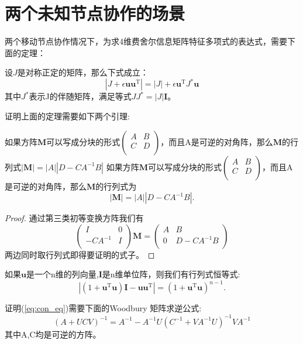 \section{两个未知节点协作的场景}\label{section:two_node_cooperation}
两个移动节点协作情况下，为求4维费舍尔信息矩阵特征多项式的表达式，需要下面的定理：
\begin{theorem}\label{thm:ShenIden}
设$J$是对称正定的矩阵，那么下式成立：
\begin{equation}\label{eq:ShenIden}
|J+\epsilon \bm{u}\bm{u}^{\textrm{T}} |=|J|+\epsilon \bm{u}^{\textrm{T}} J^*\bm{u}
\end{equation}
其中$J^*$表示J的伴随矩阵，满足等式$JJ^*=|J|\bm{I}$。
\end{theorem}
证明上面的定理需要如下两个引理:
\begin{lemma}\cite{aa}\label{lemma:block}
如果方阵$\bm{M}$可以写成分块的形式$\left(\begin{array}{cc}
A&B\\
C&D\\
\end{array}\right)$，而且A是可逆的对角阵，那么$\bm{M}$的行列式$|\bm{M}|=|A||D-CA^{-1}B|$
如果方阵$\bm{M}$可以写成分块的形式$\left(\begin{array}{cc}
A&B\\
C&D\\
\end{array}\right)$，而且A是可逆的对角阵，那么$\bm{M}$的行列式为
\begin{equation}
|\bm{M}|=|A||D-CA^{-1}B|.
\end{equation}
\end{lemma}
\begin{proof}
通过第三类初等变换方阵我们有
\begin{equation}
\left(\begin{array}{cc}
I&0\\
-CA^{-1}&I\\
\end{array}\right) \bm{M}=\left(\begin{array}{cc}
A&B\\
0&D-CA^{-1}B\\
\end{array}\right)
\end{equation}
两边同时取行列式即得要证明的式子。
\end{proof}

\begin{lemma}
如果$\bm{u}$是一个n维的列向量,$\bm{I}$是n维单位阵，则我们有行列式恒等式:
\begin{equation}\label{eq:con_eq}
|(1+\bm{u}^{\textrm{T}} \bm{u})\bm{I}-\bm{u}\bm{u}^{\textrm{T}} |=(1+\bm{u}^{\textrm{T}} \bm{u})^{n-1}.
\end{equation}
\end{lemma}
证明(\ref{eq:con_eq})需要下面的Woodbury 矩阵求逆公式:
\begin{equation}\label{eq:woodbury}
(A+UCV)^{-1}=A^{-1}-A^{-1}U(C^{-1}+VA^{-1}U)^{-1}VA^{-1}
\end{equation}
其中A,C均是可逆的方阵。


